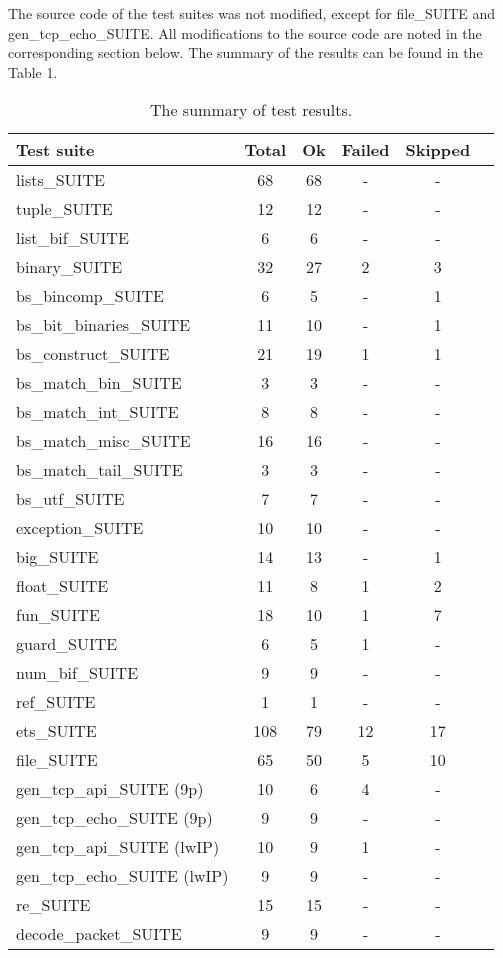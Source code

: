 \documentclass{article}
\begin{document}
The source code of the test suites was not modified, except for file\_SUITE and
gen\_tcp\_echo\_SUITE. All modifications to the source code are noted in the
corresponding section below. The summary of the results can be found in the
Table 1.

\begin{table}[!ht]
\begin{tabular}{lccccl}
Test suite & Total & Ok & Failed & Skipped \\
\hline
lists\_SUITE & 68 & 68 & - & - \\
tuple\_SUITE & 12 & 12 & - & - \\
list\_bif\_SUITE & 6 & 6 & - & - \\
binary\_SUITE & 32 & 27 & 2 & 3 \\
bs\_bincomp\_SUITE & 6 & 5 & - & 1 \\
bs\_bit\_binaries\_SUITE & 11 & 10 & - & 1 \\
bs\_construct\_SUITE & 21 & 19 & 1 & 1 \\
bs\_match\_bin\_SUITE & 3 & 3 & - & - \\
bs\_match\_int\_SUITE & 8 & 8 & - & - \\
bs\_match\_misc\_SUITE & 16 & 16 & - & - \\
bs\_match\_tail\_SUITE & 3 & 3 & - & - \\
bs\_utf\_SUITE & 7 & 7 & - & - \\
exception\_SUITE & 10 & 10 & - & - \\
big\_SUITE & 14 & 13 & - & 1 \\
float\_SUITE & 11 & 8 & 1 & 2 \\
fun\_SUITE & 18 & 10 & 1 & 7 \\
guard\_SUITE & 6 & 5 & 1 & - \\
num\_bif\_SUITE & 9 & 9 & - & - \\
ref\_SUITE & 1 & 1 & - & - \\
\hline
ets\_SUITE & 108 & 79 & 12 & 17 \\
file\_SUITE & 65 & 50 & 5 & 10 \\
gen\_tcp\_api\_SUITE (9p) & 10 & 6 & 4 & - \\
gen\_tcp\_echo\_SUITE (9p) & 9 & 9 & - & - \\
gen\_tcp\_api\_SUITE (lwIP) & 10 & 9 & 1 & - \\
gen\_tcp\_echo\_SUITE (lwIP) & 9 & 9 & - & - \\
re\_SUITE & 15 & 15 & - & - \\
decode\_packet\_SUITE & 9 & 9 & - & - \\
\hline
\end{tabular}
\caption{The summary of test results.}
\end{table}
\end{document}
